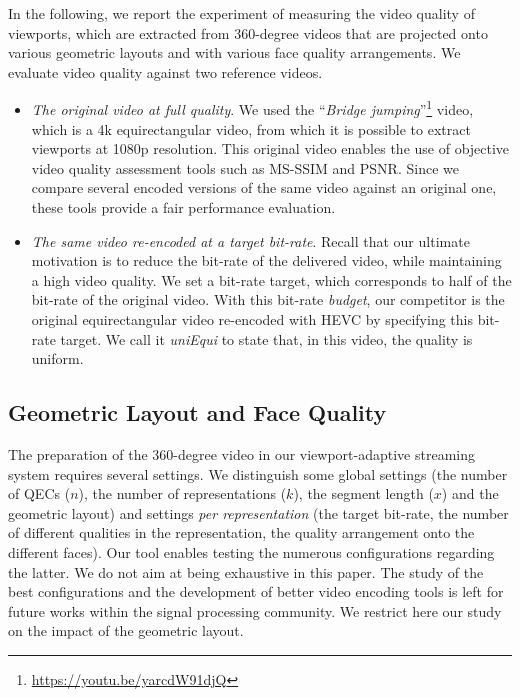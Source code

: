 In the following, we report the experiment of measuring the video quality of viewports, which
are extracted from 360-degree videos that are projected onto various geometric layouts and 
with various
face quality arrangements. We evaluate video quality against two reference videos.
\begin{itemize}
\item \emph{The original video at full quality}. We used the
``\emph{Bridge
jumping}''\footnote{\url{https://youtu.be/yarcdW91djQ}} video, which is a 4k equirectangular
video, from which it is possible to extract viewports at 1080p resolution. This original video 
enables the use of objective video quality assessment tools such as \ac{MS-SSIM} and
\ac{PSNR}. Since we compare several encoded versions of the same video against an original
one, these tools provide
a fair performance evaluation.
\item \emph{The same video re-encoded at a target bit-rate}. Recall that our ultimate motivation 
is to reduce the bit-rate of the delivered video, while maintaining a high video quality. We set
a bit-rate target, which corresponds to half of the bit-rate of the original video. With this bit-rate
\emph{budget}, our competitor is the original equirectangular video re-encoded with 
\ac{HEVC} by specifying this bit-rate target. We call it \emph{uniEqui} to state that, in this
video, the quality is uniform. 
\end{itemize}

\subsection{Geometric Layout and Face Quality}
\label{sec:geometry}
The preparation of the 360-degree video in our viewport-adaptive streaming system
requires several settings. We distinguish some global settings (the number of \acp{QEC} ($n$), 
the number of representations ($k$), the segment length ($x$) and the geometric layout) 
and settings \emph{per representation}
(the target bit-rate, the number of different qualities in the representation, the quality 
arrangement onto the different
faces). Our tool enables testing the numerous configurations regarding the latter. We do not aim
at being exhaustive in this paper. The study of the best configurations and the development
of better video encoding tools is left for future works within the signal processing 
community. We restrict here our study on the impact of the geometric layout.


